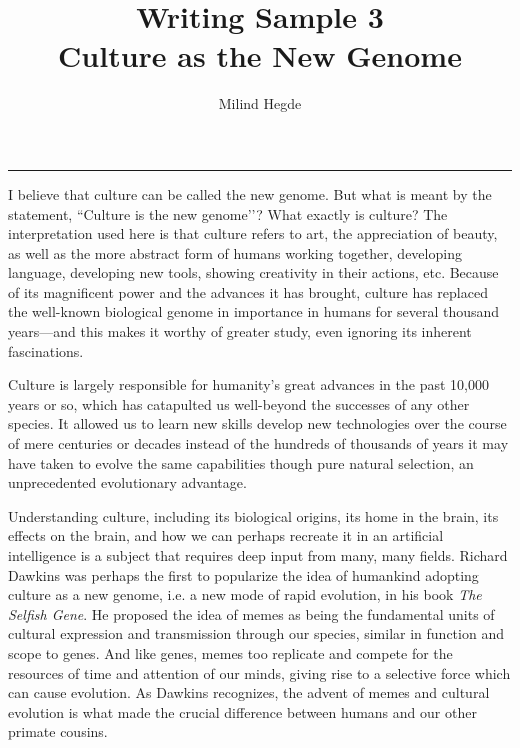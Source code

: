 \documentclass[11pt,a4paper]{article}
\title{\Large{Writing Sample 3}\\\bigskip \vspace{0.1cm}\huge{\color{spot}Culture as the New Genome}\vspace{0cm}}
\author{Milind Hegde}
\date{}
\begin{document}
\fontsize{11.25}{18}\selectfont
\setlength{\parskip}{0.15cm plus4mm minus3mm}
\maketitle

\begin{center}
\textcolor{spot}{\rule[2cm]{\textwidth}{1.5pt}}
\vspace*{-2.4cm}
\end{center}

\lettrine[lines=2, findent = 1pt, nindent = 3pt, loversize=0.05]{I}{} believe that culture can be called the new genome. But what is meant by the statement, ``Culture is the new genome’’? What exactly is culture? The interpretation used here is that culture refers to art, the appreciation of beauty, as well as the more abstract form of humans working together, developing language, developing new tools, showing creativity in their actions, etc. Because of its magnificent power and the advances it has brought, culture has replaced the well-known biological genome in importance in humans for several thousand years---and this makes it worthy of greater study, even ignoring its inherent fascinations.

Culture is largely responsible for humanity’s great advances in the past 10,000 years or so, which has catapulted us well-beyond the successes of any other species. It allowed us to learn new skills develop new technologies over the course of mere centuries or decades instead of the hundreds of thousands of years it may have taken to evolve the same capabilities though pure natural selection, an unprecedented evolutionary advantage.

Understanding culture, including its biological origins, its home in the brain, its effects on the brain, and how we can perhaps recreate it in an artificial intelligence is a subject that requires deep input from many, many fields. Richard Dawkins was perhaps the first to popularize the idea of humankind adopting culture as a new genome, i.e. a new mode of rapid evolution, in his book \emph{The Selfish Gene}\cite{dawkins}. He proposed the idea of memes as being the fundamental units of cultural expression and transmission through our species, similar in function and scope to genes. And like genes, memes too replicate and compete for the resources of time and attention of our minds, giving rise to a selective force which can cause evolution. As Dawkins recognizes, the advent of memes and cultural evolution is what made the crucial difference between humans and our other primate cousins.
\end{document}
